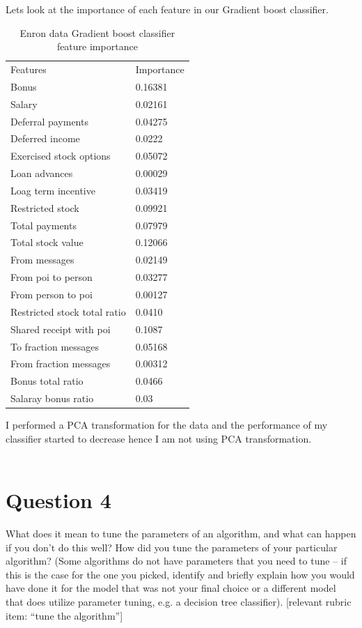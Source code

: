 \documentclass[12pt]{article}%
\begin{document}
Lets look at the importance of each feature in our Gradient boost classifier.
\begin{table}[!htb]
\centering
\caption{Enron data Gradient boost classifier feature importance}
\label{my-label}
\begin{tabular}{ll}
 Features & Importance \\
 Bonus & 0.16381 \\
 Salary & 0.02161 \\
 Deferral payments & 0.04275 \\
 Deferred income &  0.0222 \\
 Exercised stock options &  0.05072 \\
 Loan advances & 0.00029 \\
 Loag term incentive & 0.03419 \\
 Restricted stock & 0.09921\\
 Total payments & 0.07979 \\
 Total stock value & 0.12066 \\
 From messages & 0.02149 \\
 From poi to person & 0.03277 \\
 From person to poi &  0.00127 \\
 Restricted stock total ratio & 0.0410 \\
 Shared receipt with poi & 0.1087 \\
 To fraction messages & 0.05168 \\
 From fraction messages & 0.00312 \\
 Bonus total ratio & 0.0466 \\
 Salaray bonus ratio & 0.03 \\
 
\end{tabular}
\end{table}
\newpage
I performed a PCA transformation for the data and the performance of my classifier started to decrease hence I am not using PCA transformation.
\\
\\

\section*{Question 4}
What does it mean to tune the parameters of an algorithm, and what can happen if you don’t do this well?  How did you tune the parameters of your particular algorithm? (Some algorithms do not have parameters that you need to tune -- if this is the case for the one you picked, identify and briefly explain how you would have done it for the model that was not your final choice or a different model that does utilize parameter tuning, e.g. a decision tree classifier).  [relevant rubric item: “tune the algorithm”]
\end{document}

